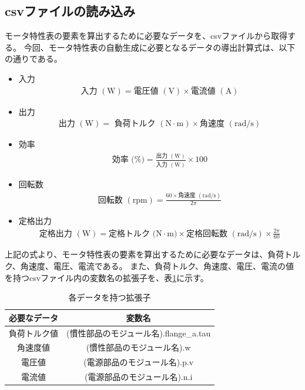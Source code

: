 \subsection{csvファイルの読み込み}\label{sub:csv_scan}
モータ特性表の要素を算出するために必要なデータを、csvファイルから取得する。
今回、モータ特性表の自動生成に必要となるデータの導出計算式は、以下の通りである。
\begin{itemize}

    \item 入力
    \begin{eqnarray}
        \mbox{入力 $(\mathrm{W})$} = \mbox{電圧値 $(\mathrm{V})$} \times \mbox{電流値 $(\mathrm{A})$} 　\label{siki:in}
    \end{eqnarray}
    \item 出力 
    \begin{eqnarray}
        \mbox{出力 $(\mathrm{W})$} = \mbox{ 負荷トルク $(\mathrm{N \cdot m})$} \times \mbox{角速度 $(\mathrm{rad/s})$} \label{siki:out}
    \end{eqnarray}
    \item 効率
    \begin{eqnarray}
        \mbox{効率 (\%)} = \frac{\mbox{出力 $(\mathrm{W})$}}{\mbox{入力 $(\mathrm{W})$}}  \times 100 \label{siki:effi}
    \end{eqnarray}
    \item 回転数
    \begin{eqnarray}
        \mbox{回転数 $(\mathrm{rpm})$} = \frac{60 \times \mbox{角速度 $(\mathrm{rad/s})$}}{2\pi}   \label{siki:speed}
    \end{eqnarray}
    \item 定格出力
    \begin{eqnarray}
        \mbox{定格出力 $(\mathrm{W})$} = \mbox{定格トルク $(\mathrm{N \cdot m)}$} \times \mbox{定格回転数  $(\mathrm{rad/s})$} \times \frac{2\pi}{60}　
        \label{siki:teikaku}
    \end{eqnarray}
     
\end{itemize}

上記の式より、モータ特性表の要素を算出するために必要なデータは、負荷トルク、角速度、電圧、電流である。
また、負荷トルク、角速度、電圧、電流の値を持つcsvファイル内の変数名の拡張子を、表\ref{tab:hensuu}に示す。　
\begin{table}[t]
	\centering
	\caption{各データを持つ拡張子}
	\begin{tabular}{|c|c|} \hline
	  必要なデータ & 変数名 \\ \hline \hline
	  負荷トルク値 & (慣性部品のモジュール名).flange\_a.tau \\ \hline
	  角速度値 &  (慣性部品のモジュール名).w \\ \hline
	  電圧値 &  (電源部品のモジュール名).p.v \\ \hline
	  電流値 &  (電源部品のモジュール名).n.i \\ \hline
	\end{tabular}
	\label{tab:hensuu}
  \end{table}


